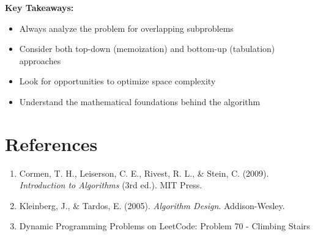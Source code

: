 \documentclass[12pt,a4paper]{article}
\begin{document}
\textbf{Key Takeaways:}
\begin{itemize}
\item Always analyze the problem for overlapping subproblems
\item Consider both top-down (memoization) and bottom-up (tabulation) approaches
\item Look for opportunities to optimize space complexity
\item Understand the mathematical foundations behind the algorithm
\end{itemize}

\section{References}

\begin{enumerate}
\item Cormen, T. H., Leiserson, C. E., Rivest, R. L., \& Stein, C. (2009). \textit{Introduction to Algorithms} (3rd ed.). MIT Press.
\item Kleinberg, J., \& Tardos, E. (2005). \textit{Algorithm Design}. Addison-Wesley.
\item Dynamic Programming Problems on LeetCode: Problem 70 - Climbing Stairs
\end{enumerate}
\end{document}
